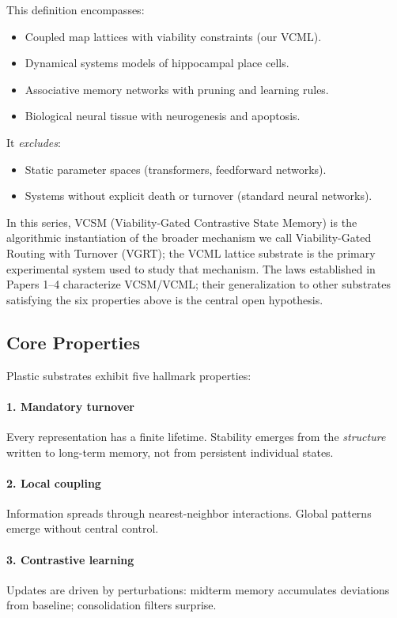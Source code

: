 \documentclass[11pt]{article}
\begin{document}
This definition encompasses:
\begin{itemize}
\item Coupled map lattices with viability constraints (our VCML).
\item Dynamical systems models of hippocampal place cells.
\item Associative memory networks with pruning and learning rules.
\item Biological neural tissue with neurogenesis and apoptosis.
\end{itemize}

It \emph{excludes}:
\begin{itemize}
\item Static parameter spaces (transformers, feedforward networks).
\item Systems without explicit death or turnover (standard neural networks).
\end{itemize}

In this series, VCSM (Viability-Gated Contrastive State Memory) is the algorithmic instantiation of the broader mechanism we call Viability-Gated Routing with Turnover (VGRT); the VCML lattice substrate is the primary experimental system used to study that mechanism. The laws established in Papers 1--4 characterize VCSM/VCML; their generalization to other substrates satisfying the six properties above is the central open hypothesis.

\subsection{Core Properties}

Plastic substrates exhibit five hallmark properties:

\paragraph{1. Mandatory turnover}
Every representation has a finite lifetime. Stability emerges from the \emph{structure} written to long-term memory, not from persistent individual states.

\paragraph{2. Local coupling}
Information spreads through nearest-neighbor interactions. Global patterns emerge without central control.

\paragraph{3. Contrastive learning}
Updates are driven by perturbations: midterm memory accumulates deviations from baseline; consolidation filters surprise.
\end{document}
